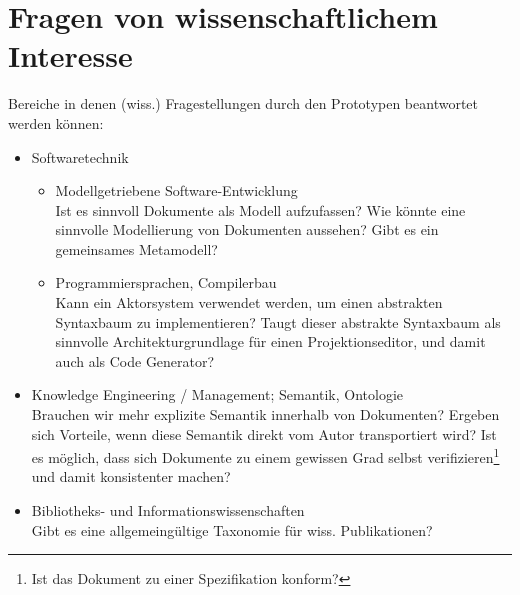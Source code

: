 

\section{Fragen von wissenschaftlichem Interesse}

Bereiche in denen (wiss.) Fragestellungen durch den Prototypen beantwortet werden können:

\begin{itemize}
  \item Softwaretechnik

  \begin{itemize}
    \item Modellgetriebene Software-Entwicklung\\
          Ist es sinnvoll Dokumente als Modell aufzufassen?
          Wie könnte eine sinnvolle Modellierung von Dokumenten aussehen?
          Gibt es ein gemeinsames Metamodell?
    \item Programmiersprachen, Compilerbau\\
          Kann ein Aktorsystem verwendet werden, um einen abstrakten Syntaxbaum zu implementieren?
          Taugt dieser abstrakte Syntaxbaum als sinnvolle Architekturgrundlage für einen Projektionseditor, und damit auch als Code Generator?
  \end{itemize}

  \item Knowledge Engineering / Management; Semantik, Ontologie\\
        Brauchen wir mehr explizite Semantik innerhalb von Dokumenten?
        Ergeben sich Vorteile, wenn diese Semantik direkt vom Autor transportiert wird?
        Ist es möglich, dass sich Dokumente zu einem gewissen Grad selbst verifizieren\footnote{Ist das Dokument zu einer Spezifikation konform?} und damit konsistenter machen?

  \item Bibliotheks- und Informationswissenschaften\\
        Gibt es eine allgemeingültige Taxonomie für wiss. Publikationen?
\end{itemize}



